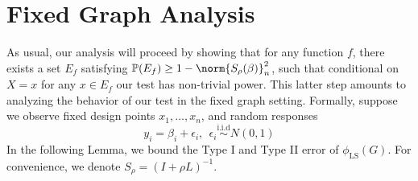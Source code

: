 \documentclass{article}
\newcommand{\1}{\mathbf{1}}
\newcommand{\Pbb}{\mathbb{P}}
\newcommand{\LS}{\mathrm{LS}}
\theoremstyle{alden}
\theoremstyle{aldenthm}
\theoremstyle{definition}
\theoremstyle{remark}
\begin{document}
\section{Fixed Graph Analysis}
As usual, our analysis will proceed by showing that for any function $f$, there exists a set $E_f$ satisfying $\Pbb(E_f) \geq 1 - \norm{S_{\rho}(\beta)}_n^2$, such that conditional on $X = x$ for any $x \in E_f$ our test has non-trivial power. This latter step amounts to analyzing the behavior of our test in the fixed graph setting. Formally, suppose we observe fixed design points $x_1,\ldots,x_n$, and random responses 
\begin{equation}
\label{eqn:fixed_design_model}
y_i = \beta_i + \epsilon_i,~~ \epsilon_i \overset{\textrm{i.i.d}}{\sim} N(0,1)
\end{equation}
In the following Lemma, we bound the Type I and Type II error of $\phi_{\LS}(G)$. For convenience, we denote $S_{\rho} = (I + \rho L)^{-1}$.
\end{document}
